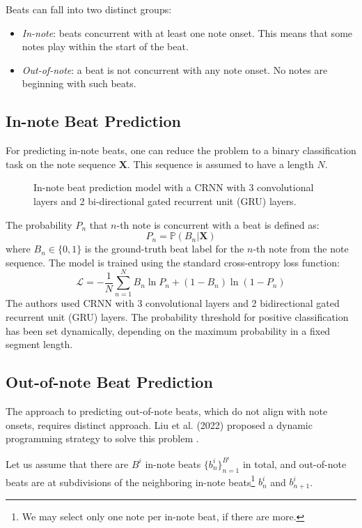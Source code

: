Beats can fall into two distinct groups:
\begin{itemize}
	\item \emph{In-note}: beats concurrent with at least one note onset. This means that some notes play within the start of the beat.
	\item \emph{Out-of-note}: a beat is not concurrent with any note onset. No notes are beginning with such beats.
\end{itemize}

\subsection{In-note Beat Prediction}

For predicting in-note beats, one can reduce the problem to a binary classification task on the note sequence $\mathbf{X}$. This sequence is assumed to have a length $N$.

\begin{figure}[!ht]
\centering

\caption[In-note beat prediction model.]{In-note beat prediction model with a CRNN with 3 convolutional layers and 2 bi-directional gated recurrent unit (GRU) layers.}
\end{figure}

The probability $P_n$ that $n$-th note is concurrent with a beat is defined as: \[P_n = \mathbb{P}\left(B_n|\mathbf{X}\right)\] where $B_n\in\{0,1\}$ is the ground-truth beat label for the $n$-th note from the note sequence. The model is trained using the standard cross-entropy loss function: \[\mathcal{L}=-\frac{1}{N}\sum_{n=1}^N B_n\ln P_n + \left(1-B_n\right)\ln\left(1-P_n\right)\] The authors used CRNN with 3 convolutional layers and 2 bidirectional gated recurrent unit (GRU) layers. The probability threshold for positive classification has been set dynamically, depending on the maximum probability in a fixed segment length.

\subsection{Out-of-note Beat Prediction}

The approach to predicting out-of-note beats, which do not align with note onsets, requires distinct approach. Liu et al. (2022) proposed a dynamic programming strategy to solve this problem \cite{Liu2022}.

Let us assume that there are $B^i$ in-note beats $\{b_n^i\}_{n=1}^{B^i}$ in total, and out-of-note beats are at subdivisions of the neighboring in-note beats\footnote{We may select only one note per in-note beat, if there are more.} $b_{n}^i$ and $b_{n+1}^i$.

